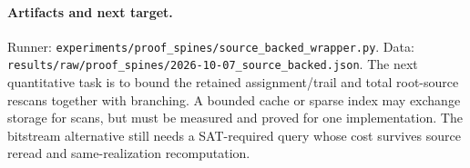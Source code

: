 \documentclass[11pt]{article}
\begin{document}
\paragraph{Artifacts and next target.}
Runner: \texttt{experiments/proof\_spines/source\_backed\_wrapper.py}.
Data: \texttt{results/raw/proof\_spines/2026-10-07\_source\_backed.json}.
The next quantitative task is to bound the retained assignment/trail and total
root-source rescans together with branching. A bounded cache or sparse index may
exchange storage for scans, but must be measured and proved for one implementation.
The bitstream alternative still needs a SAT-required query whose cost survives
source reread and same-realization recomputation.
\end{document}
